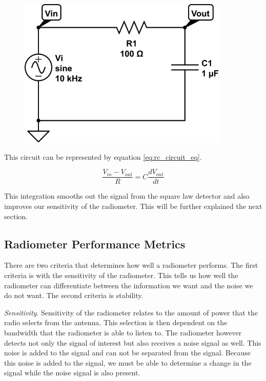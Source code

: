 {\begin{figure}[h!tb] 
\centering
\includegraphics[width=10cm]{Images/rc-circuit.png}
\label{rc_circuit}
\end{figure}
}

This circuit can be represented by equation \ref{eq:rc_circuit_eq}.

\begin{equation}\label{eq:rc_circuit_eq}
\frac{V_{in}-V_{out}}{R}=C\frac{dV_{out}}{dt}
\end{equation}

This integration smooths out the signal from the square law detector and also improves our sensitivity of the radiometer.  This will be further explained the next section.

\subsection{Radiometer Performance Metrics}
There are two criteria that determines how well a radiometer performs.  The first criteria is with the sensitivity of the radiometer.  This tells us how well the radiometer can differentiate between the information we want and the noise we do not want.  The second criteria is stability.

\emph{Sensitivity}.  Sensitivity of the radiometer relates to the amount of power that the radio selects from the antenna.  This selection is then dependent on the bandwidth that the radiometer is able to listen to.  The radiometer however detects not only the signal of interest but also receives a noise signal as well.  This noise is added to the signal and can not be separated from the signal.  Because this noise is added to the signal, we must be able to determine a change in the signal while the noise signal is also present.  

